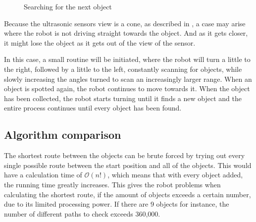 \begin{figure}[H]
     \caption{\label{fig:object_navigation_niv2} Searching for the next object}
\end{figure} 

Because the ultrasonic sensors view is a cone, as described in , a case may arise where the robot is not driving straight towards the object. And as it gets closer, it might lose the object as it gets out of the view of the sensor.

In this case, a small routine will be initiated, where the robot will turn a little to the right, followed by a little to the left, constantly scanning for objects, while slowly increasing the angles turned to scan an increasingly larger range. When an object is spotted again, the robot continues to move towards it. When the object has been collected, the robot starts turning until it finds a new object and the entire process continues until every object has been found.


\subsection{Algorithm comparison} \label{sec:algorithm-desc}

The shortest route between the objects can be brute forced by trying out every single possible route between the start position and all of the objects. This would have a calculation time of $\mathcal{O}(n!)$, which means that with every object added, the running time greatly increases. This gives the robot problems when calculating the shortest route, if the amount of objects exceeds a certain number, due to its limited processing power. If there are 9 objects for instance, the number of different paths to check exceeds 360,000.  

